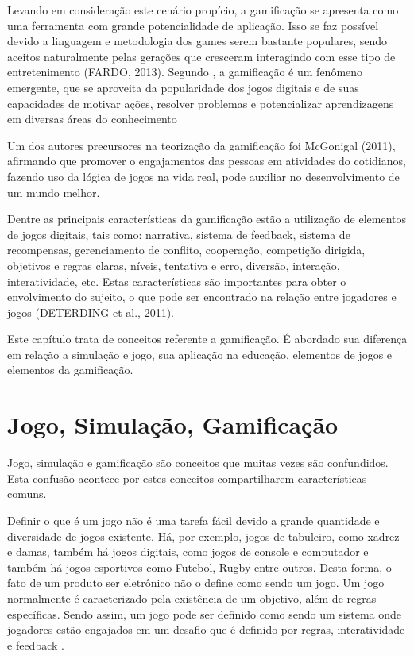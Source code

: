 \documentclass[
	12pt,				%
	oneside,			%
	a4paper,			%
	english,			%
	french,				%
	spanish,			%
	brazil,				%
	]{abntex2}
\begin{document}
Levando em consideração este cenário propício, a gamificação se apresenta como uma ferramenta com grande potencialidade de aplicação. Isso se faz possível devido a linguagem e metodologia dos games serem bastante populares, sendo aceitos naturalmente pelas gerações que cresceram interagindo com esse tipo de entretenimento (FARDO, 2013). Segundo \citet{deterding2011game}, a gamificação é um fenômeno emergente, que se aproveita da popularidade dos jogos digitais e de suas capacidades de motivar ações, resolver problemas e potencializar aprendizagens em diversas áreas do conhecimento

Um dos autores precursores na teorização da gamificação foi McGonigal (2011), afirmando que promover o engajamentos das pessoas em atividades do cotidianos, fazendo uso da lógica de jogos na vida real, pode auxiliar no desenvolvimento de um mundo melhor.

Dentre as principais características da gamificação estão a utilização de elementos de jogos digitais, tais como: narrativa, sistema de feedback, sistema de recompensas, gerenciamento de conflito, cooperação, competição dirigida, objetivos e regras claras, níveis, tentativa e erro, diversão, interação, interatividade, etc. Estas características são importantes para obter o envolvimento do sujeito, o que pode ser encontrado na relação entre jogadores e jogos (DETERDING et al., 2011).

Este capítulo trata de conceitos referente a gamificação. É abordado sua diferença em relação a simulação e jogo, sua aplicação na educação, elementos de jogos e elementos da gamificação.

\section{Jogo, Simulação, Gamificação}

Jogo, simulação e gamificação são conceitos que muitas vezes são confundidos. Esta confusão acontece por estes conceitos compartilharem características comuns.

Definir o que é um jogo não é uma tarefa fácil devido a grande quantidade e diversidade de jogos existente. Há, por exemplo, jogos de tabuleiro, como xadrez e damas, também há jogos digitais, como jogos de console e computador e também há jogos esportivos como Futebol, Rugby entre outros. Desta forma, o fato de um produto ser eletrônico não o define como sendo um jogo. Um jogo normalmente é caracterizado pela existência de um objetivo, além de regras específicas. Sendo assim, um jogo pode ser definido como sendo um sistema onde jogadores estão engajados em um desafio que é definido por regras, interatividade e feedback \cite{kaap:2014}. 
\end{document}
